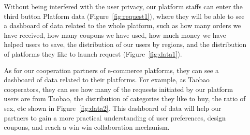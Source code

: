 Without being interfered with the user privacy, our platform staffs can enter the third button Platform data (Figure~\ref{fig:request1}), where they will be able to see a dashboard of data related to the whole platform, such as how many orders we have received, how many coupons we have used, how much money we have helped users to save, the distribution of our users by regions, and the distribution of platforms they like to launch request (Figure~\ref{fig:data1}).

As for our cooperation partners of e-commerce platforms, they can see a dashboard of data related to their platforms. For example, as Taobao cooperators, they can see how many of the requests initiated by our platform users are from Taobao, the distribution of categories they like to buy, the ratio of sex, etc shown in Figure~\ref{fig:data2}. This dashboard of data will help our partners to gain a more practical understanding of user preferences, design coupons, and reach a win-win collaboration mechanism.
